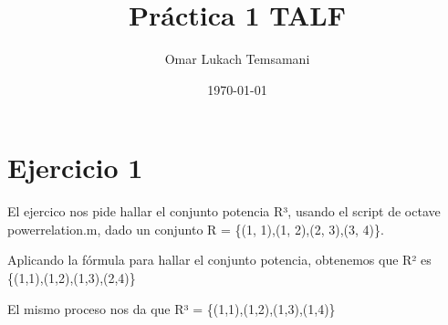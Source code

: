 \documentclass{article}
\title{Práctica 1 TALF}
\author{Omar Lukach Temsamani}
\date{\today}
\begin{document}

\maketitle
\section {Ejercicio 1}

El ejercico nos pide hallar el conjunto potencia R³, usando el script de octave powerrelation.m, dado un conjunto R = \{(1, 1),(1, 2),(2, 3),(3, 4)\}. 

Aplicando la fórmula para hallar el conjunto potencia, obtenemos que R² es \{(1,1),(1,2),(1,3),(2,4)\}

El mismo proceso nos da que R³ = \{(1,1),(1,2),(1,3),(1,4)\}
\end{document}

